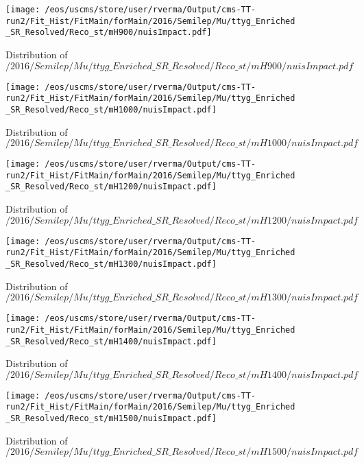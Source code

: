 \begin{figure}
\centering
\texttt{[image: /eos/uscms/store/user/rverma/Output/cms-TT-run2/Fit\_Hist/FitMain/forMain/2016/Semilep/Mu/ttyg\_Enriched\_SR\_Resolved/Reco\_st/mH900/nuisImpact.pdf]}
\caption{Distribution of $/2016/Semilep/Mu/ttyg\_Enriched\_SR\_Resolved/Reco\_st/mH900/nuisImpact.pdf$}
\end{figure}

\begin{figure}
\centering
\texttt{[image: /eos/uscms/store/user/rverma/Output/cms-TT-run2/Fit\_Hist/FitMain/forMain/2016/Semilep/Mu/ttyg\_Enriched\_SR\_Resolved/Reco\_st/mH1000/nuisImpact.pdf]}
\caption{Distribution of $/2016/Semilep/Mu/ttyg\_Enriched\_SR\_Resolved/Reco\_st/mH1000/nuisImpact.pdf$}
\end{figure}

\begin{figure}
\centering
\texttt{[image: /eos/uscms/store/user/rverma/Output/cms-TT-run2/Fit\_Hist/FitMain/forMain/2016/Semilep/Mu/ttyg\_Enriched\_SR\_Resolved/Reco\_st/mH1200/nuisImpact.pdf]}
\caption{Distribution of $/2016/Semilep/Mu/ttyg\_Enriched\_SR\_Resolved/Reco\_st/mH1200/nuisImpact.pdf$}
\end{figure}

\begin{figure}
\centering
\texttt{[image: /eos/uscms/store/user/rverma/Output/cms-TT-run2/Fit\_Hist/FitMain/forMain/2016/Semilep/Mu/ttyg\_Enriched\_SR\_Resolved/Reco\_st/mH1300/nuisImpact.pdf]}
\caption{Distribution of $/2016/Semilep/Mu/ttyg\_Enriched\_SR\_Resolved/Reco\_st/mH1300/nuisImpact.pdf$}
\end{figure}

\begin{figure}
\centering
\texttt{[image: /eos/uscms/store/user/rverma/Output/cms-TT-run2/Fit\_Hist/FitMain/forMain/2016/Semilep/Mu/ttyg\_Enriched\_SR\_Resolved/Reco\_st/mH1400/nuisImpact.pdf]}
\caption{Distribution of $/2016/Semilep/Mu/ttyg\_Enriched\_SR\_Resolved/Reco\_st/mH1400/nuisImpact.pdf$}
\end{figure}

\begin{figure}
\centering
\texttt{[image: /eos/uscms/store/user/rverma/Output/cms-TT-run2/Fit\_Hist/FitMain/forMain/2016/Semilep/Mu/ttyg\_Enriched\_SR\_Resolved/Reco\_st/mH1500/nuisImpact.pdf]}
\caption{Distribution of $/2016/Semilep/Mu/ttyg\_Enriched\_SR\_Resolved/Reco\_st/mH1500/nuisImpact.pdf$}
\end{figure}

